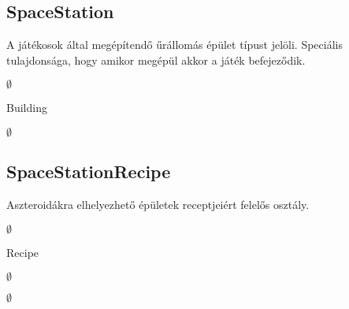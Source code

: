 \subsection{SpaceStation}
\begin{class-template-responsibility}
A játékosok által megépítendő űrállomás épület típust jelöli. Speciális tulajdonsága, hogy amikor megépül akkor a játék befejeződik.
\end{class-template-responsibility}
\begin{class-template-interface}
$\emptyset$
\end{class-template-interface}
\begin{class-template-baseclass}
Building
\end{class-template-baseclass}
\begin{class-template-attribute}
\item[] $\emptyset$
\end{class-template-attribute}
\begin{class-template-method}
\end{class-template-method}


\subsection{SpaceStationRecipe}
\begin{class-template-responsibility}
Aszteroidákra elhelyezhető épületek receptjeiért felelős osztály. 
\end{class-template-responsibility}
\begin{class-template-interface}
$\emptyset$
\end{class-template-interface}
\begin{class-template-baseclass}
Recipe
\end{class-template-baseclass}
\begin{class-template-attribute}
\item[] $\emptyset$
\end{class-template-attribute}
\begin{class-template-method}
\item[] $\emptyset$
\end{class-template-method}


